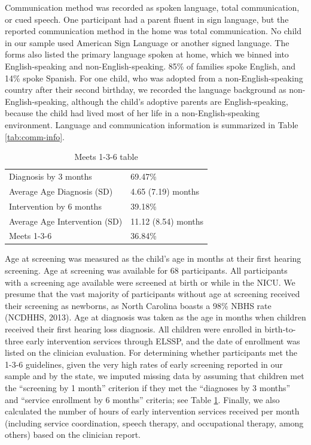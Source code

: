 \documentclass[
  english,
  man]{apa6}
\begin{document}
Communication method was recorded as spoken language, total communication, or cued speech. One participant had a parent fluent in sign language, but the reported communication method in the home was total communication. No child in our sample used American Sign Language or another signed language. The forms also listed the primary language spoken at home, which we binned into English-speaking and non-English-speaking. 85\% of families spoke English, and 14\% spoke Spanish. For one child, who was adopted from a non-English-speaking country after their second birthday, we recorded the language background as non-English-speaking, although the child's adoptive parents are English-speaking, because the child had lived most of her life in a non-English-speaking environment. Language and communication information is summarized in Table \ref{tab:comm-info}.

\begin{table}[!h]

\caption{\label{tab:meets136-info}Meets 1-3-6 table}
\centering
\begin{tabular}[t]{l|l}
\hline
 & \\
\hline
Diagnosis by 3 months & 69.47\%\\
\hline
Average Age Diagnosis (SD) & 4.65 (7.19) months\\
\hline
Intervention by 6 months & 39.18\%\\
\hline
Average Age Intervention (SD) & 11.12 (8.54) months\\
\hline
Meets 1-3-6 & 36.84\%\\
\hline
\end{tabular}
\end{table}

Age at screening was measured as the child's age in months at their first hearing screening. Age at screening was available for 68 participants. All participants with a screening age available were screened at birth or while in the NICU. We presume that the vast majority of participants without age at screening received their screening as newborns, as North Carolina boasts a 98\% NBHS rate (NCDHHS, 2013). Age at diagnosis was taken as the age in months when children received their first hearing loss diagnosis. All children were enrolled in birth-to-three early intervention services through ELSSP, and the date of enrollment was listed on the clinician evaluation. For determining whether participants met the 1-3-6 guidelines, given the very high rates of early screening reported in our sample and by the state, we imputed missing data by assuming that children met the \enquote{screening by 1 month} criterion if they met the \enquote{diagnoses by 3 months} and \enquote{service enrollment by 6 months} criteria; see Table \ref{tab:meets136-info}. Finally, we also calculated the number of hours of early intervention services received per month (including service coordination, speech therapy, and occupational therapy, among others) based on the clinician report.
\end{document}
